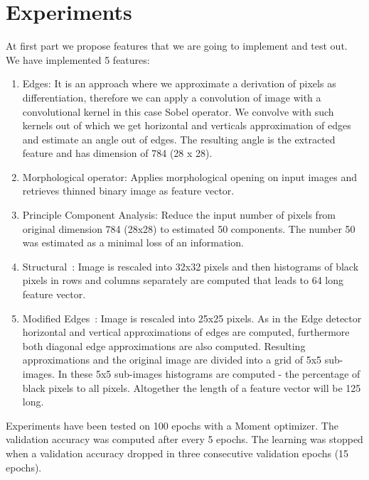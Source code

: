 \documentclass[journal]{IEEEtran}
\begin{document}
\section{Experiments}
At first part we propose features that we are going to implement and test out. We have implemented 5 features:
\begin{enumerate}
\item{Edges:}
	It is an approach where we approximate a derivation of pixels as differentiation, therefore we can apply a convolution of image with a convolutional kernel in this case Sobel operator. We convolve with such kernels out of which we get horizontal and verticals approximation of edges and estimate an angle out of edges. The resulting angle is the extracted feature and has dimension of 784 (28 x 28).
\item{Morphological operator:}
	Applies morphological opening on input images and retrieves thinned binary image as feature vector.
\item{Principle Component Analysis:}
	Reduce the input number of pixels from original dimension 784 (28x28) to estimated 50 components. The number 50 was estimated as a minimal loss of an information.
\item{Structural~\cite{features}:}
	Image is rescaled into 32x32 pixels and then histograms of black pixels in rows and columns separately are computed that leads to 64 long feature vector.
\item{Modified Edges~\cite{features}:}
	Image is rescaled into 25x25 pixels. As in the Edge detector horizontal and vertical approximations of edges are computed, furthermore both diagonal edge approximations are also computed. Resulting approximations and the original image are divided into a grid of 5x5 sub-images. In these 5x5 sub-images histograms are computed - the percentage of black pixels to all pixels. Altogether the length of a feature vector will be 125 long.
\end{enumerate}

Experiments have been tested on 100 epochs with a Moment optimizer. The validation accuracy was computed after every 5 epochs. The learning was stopped when a validation accuracy dropped in three consecutive validation epochs (15 epochs).
\end{document}
